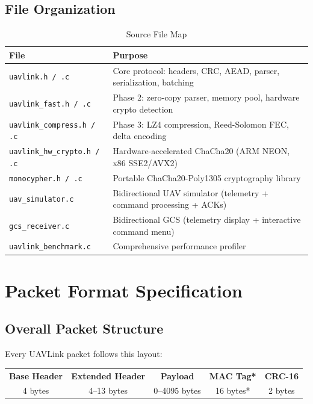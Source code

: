 \documentclass[11pt,a4paper]{article}
\begin{document}
\subsection{File Organization}

\begin{table}[H]
\centering
\begin{tabularx}{\textwidth}{@{}lX@{}}
\toprule
\textbf{File} & \textbf{Purpose} \\
\midrule
\texttt{uavlink.h / .c}           & Core protocol: headers, CRC, AEAD, parser, serialization, batching \\
\texttt{uavlink\_fast.h / .c}     & Phase 2: zero-copy parser, memory pool, hardware crypto detection \\
\texttt{uavlink\_compress.h / .c} & Phase 3: LZ4 compression, Reed-Solomon FEC, delta encoding \\
\texttt{uavlink\_hw\_crypto.h / .c} & Hardware-accelerated ChaCha20 (ARM NEON, x86 SSE2/AVX2) \\
\texttt{monocypher.h / .c}        & Portable ChaCha20-Poly1305 cryptography library \\
\texttt{uav\_simulator.c}         & Bidirectional UAV simulator (telemetry + command processing + ACKs) \\
\texttt{gcs\_receiver.c}          & Bidirectional GCS (telemetry display + interactive command menu) \\
\texttt{uavlink\_benchmark.c}     & Comprehensive performance profiler \\
\bottomrule
\end{tabularx}
\caption{Source File Map}
\end{table}

\newpage
\section{Packet Format Specification}

\subsection{Overall Packet Structure}

Every UAVLink packet follows this layout:

\begin{center}
\begin{tabular}{|c|c|c|c|c|}
\hline
\textbf{Base Header} & \textbf{Extended Header} & \textbf{Payload} & \textbf{MAC Tag*} & \textbf{CRC-16} \\
4 bytes & 4--13 bytes & 0--4095 bytes & 16 bytes* & 2 bytes \\
\hline
\end{tabular}
\end{center}
\end{document}
